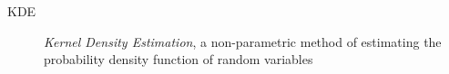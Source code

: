 \begin{description}
    \item[KDE]
        \emph{Kernel Density Estimation}, a non-parametric method of estimating the probability density function of random variables \cite{kde}
\end{description}
